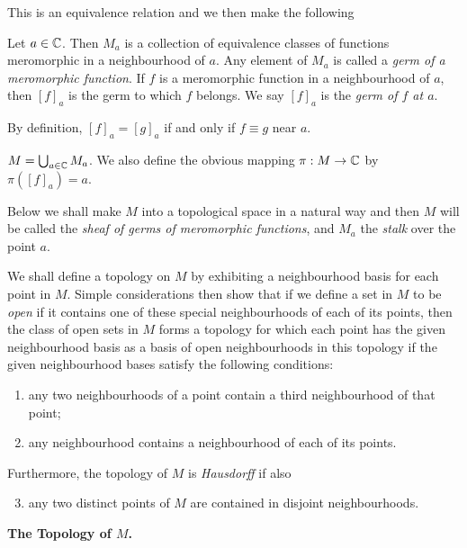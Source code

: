 \documentclass[a4paper,11pt]{article}
\begin{document}
This is an equivalence relation and we then make the following
\begin{defn}
  Let $a \in {\mathbb C}$.  Then $M_a$ is a collection of equivalence classes
  of functions meromorphic in a neighbourhood of $a$.  Any element of
  $M_a$ is called a \emph{germ of a meromorphic function}.  If $f$ is
  a meromorphic function in a neighbourhood of $a$, then $[f]_a$ is
  the germ to which $f$ belongs.  We say $[f]_a$ is the \emph{germ of
    $f$ at $a$}.
\end{defn}

By definition, $[f]_a = [g]_a$ if and only if $f \equiv g$ near $a$.

\begin{defn}
  $M = \bigcup_{a\in{\mathbb C}} M_a$.  We also define the obvious mapping
  $\pi : M \to {\mathbb C}$ by $\pi([f]_a) = a$.
\end{defn}

Below we shall make $M$ into a topological space in a natural way and
then $M$ will be called the \emph{sheaf of germs of meromorphic
  functions}, and $M_a$ the \emph{stalk} over the point $a$.

We shall define a topology on $M$ by exhibiting a neighbourhood basis
for each point in $M$.  Simple considerations then show that if we
define a set in $M$ to be \emph{open} if it contains one of these
special neighbourhoods of each of its points, then the class of open
sets in $M$ forms a topology for which each point has the given
neighbourhood basis as a basis of open neighbourhoods in this topology
if the given neighbourhood bases satisfy the following conditions:
\begin{enumerate}
\item any two neighbourhoods of a point contain a third neighbourhood
  of that point;
\item any neighbourhood contains a neighbourhood of each of its
  points.
\end{enumerate}
Furthermore, the topology of $M$ is \emph{Hausdorff} if also
\begin{enumerate}
\setcounter{enumi}{2}
\item any two distinct points of $M$ are contained in disjoint
  neighbourhoods.
\end{enumerate}

\begin{mdframed}[skipabove=1ex,skipbelow=1ex]
  \centerline{\bf The Topology of $M$.}
\end{mdframed}
\end{document}
